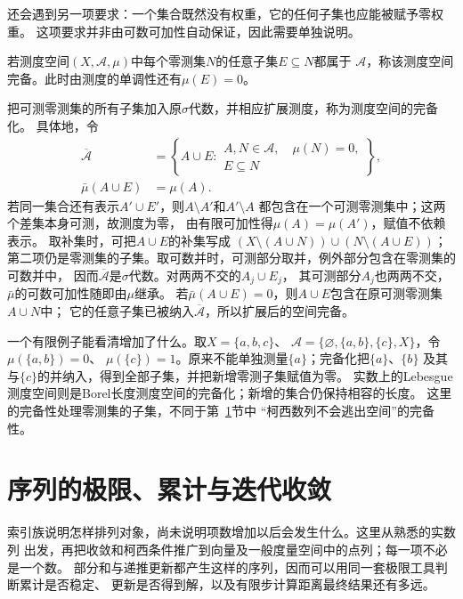 还会遇到另一项要求：一个集合既然没有权重，它的任何子集也应能被赋予零权重。
这项要求并非由可数可加性自动保证，因此需要单独说明。
\begin{definition}[完备测度空间]
\label{def:analysis-complete-measure-space}
若测度空间$(X,\mathcal{A},\mu)$中每个零测集$N$的任意子集$E\subseteq N$都属于
$\mathcal{A}$，称该测度空间完备。此时由测度的单调性还有$\mu(E)=0$。
\end{definition}
把可测零测集的所有子集加入原$\sigma$代数，并相应扩展测度，称为测度空间的完备化。
具体地，令
\[
 \begin{aligned}
 \overline{\mathcal A}
 &=\left\{A\cup E:
     \begin{array}{l}
       A,N\in\mathcal A,\quad \mu(N)=0,\\
       E\subseteq N
     \end{array}\right\},\\
 \bar\mu(A\cup E)&=\mu(A).
 \end{aligned}
\]
若同一集合还有表示$A'\cup E'$，则$A\setminus A'$和$A'\setminus A$
都包含在一个可测零测集中；这两个差集本身可测，故测度为零，
由有限可加性得$\mu(A)=\mu(A')$，赋值不依赖表示。
取补集时，可把$A\cup E$的补集写成
$(X\setminus(A\cup N))\cup(N\setminus(A\cup E))$；
第二项仍是零测集的子集。取可数并时，可测部分取并，例外部分包含在零测集的可数并中，
因而$\overline{\mathcal A}$是$\sigma$代数。对两两不交的$A_j\cup E_j$，
其可测部分$A_j$也两两不交，$\bar\mu$的可数可加性随即由$\mu$继承。
若$\bar\mu(A\cup E)=0$，则$A\cup E$包含在原可测零测集$A\cup N$中；
它的任意子集已被纳入$\overline{\mathcal A}$，所以扩展后的空间完备。

一个有限例子能看清增加了什么。取$X=\{a,b,c\}$、
$\mathcal A=\{\varnothing,\{a,b\},\{c\},X\}$，令$\mu(\{a,b\})=0$、
$\mu(\{c\})=1$。原来不能单独测量$\{a\}$；完备化把$\{a\}$、$\{b\}$
及其与$\{c\}$的并纳入，得到全部子集，并把新增零测子集赋值为零。
实数上的Lebesgue测度空间则是Borel长度测度空间的完备化；新增的集合仍保持相容的长度。
这里的完备性处理零测集的子集，不同于第~\ref{sec:analysis-sequences-series-errors}节中
“柯西数列不会逃出空间”的完备性。

\section{序列的极限、累计与迭代收敛}
\label{sec:analysis-sequences-series-errors}

索引族说明怎样排列对象，尚未说明项数增加以后会发生什么。这里从熟悉的实数列
出发，再把收敛和柯西条件推广到向量及一般度量空间中的点列；每一项不必是一个数。
部分和与递推更新都产生这样的序列，因而可以用同一套极限工具判断累计是否稳定、
更新是否得到解，以及有限步计算距离最终结果还有多远。


